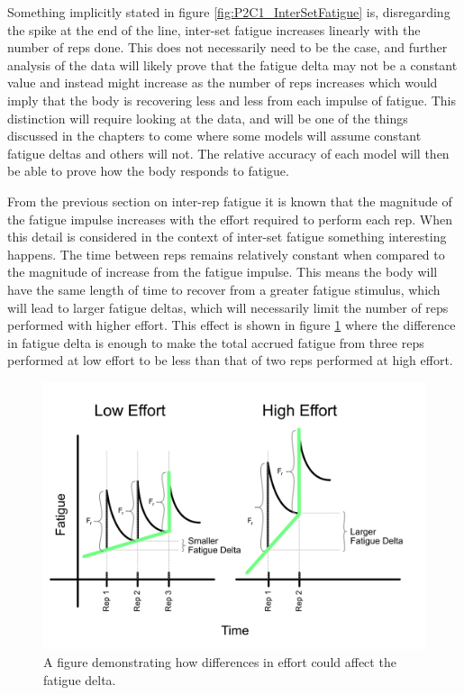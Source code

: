 Something implicitly stated in figure \ref{fig:P2C1_InterSetFatigue} is, disregarding the spike at the end of the line, inter-set fatigue increases linearly with the number of reps done. This does not necessarily need to be the case, and further analysis of the data will likely prove that the fatigue delta may not be a constant value and instead might increase as the number of reps increases which would imply that the body is recovering less and less from each impulse of fatigue. This distinction will require looking at the data, and will be one of the things discussed in the chapters to come where some models will assume constant fatigue deltas and others will not. The relative accuracy of each model will then be able to prove how the body responds to fatigue.



From the previous section on inter-rep fatigue it is known that the magnitude of the fatigue impulse increases with the effort required to perform each rep. When this detail is considered in the context of inter-set fatigue something interesting happens. The time between reps remains relatively constant when compared to the magnitude of increase from the fatigue impulse. This means the body will have the same length of time to recover from a greater fatigue stimulus, which will lead to larger fatigue deltas, which will necessarily limit the number of reps performed with higher effort. This effect is shown in figure \ref{fig:P2C1_InterSetFatigueScaledByEffort} where the difference in fatigue delta is enough to make the total accrued fatigue from three reps performed at low effort to be less than that of two reps performed at high effort.

\begin{figure}[htb]
    \centering
    \includegraphics[scale=0.55]{images/p2/ch1/InterSetFatigueDeltaDifference.png}
    \caption{A figure demonstrating how differences in effort could affect the fatigue delta.}
    \label{fig:P2C1_InterSetFatigueScaledByEffort}
\end{figure}

